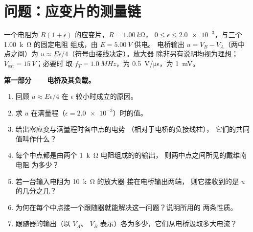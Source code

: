 \section{问题：应变片的测量链}

\begin{problem}
\label{pb:b1:operational-amplifier:1}
一个电阻为 $R(1 + \epsilon)$ 的应变片，$R = \qty{1.00}{k\ohm}$，
$0 \leq \epsilon \leq \num{2.0e-3}$，与三个 \qty{1.00}{k\ohm} 的固定电阻
组成，由 $E = \qty{5.00}{V}$ 供电。
电桥输出 $u = V_B - V_A$（两中点之间）为
$u \approx E\epsilon/4$（符号由接线决定）。放大器
除非另有说明均视为理想；$V_{\mathrm{sat}} = \qty{15}{V}$；必要时
取 $f_T = \qty{1.0}{MHz}$，为 \qty{0.5}{V/\micro s}，为
\qty{1}{mV}。

\medskip
\noindent\textbf{第一部分——电桥及其负载。}
\begin{enumerate}
  \item 回顾 $u \approx E\epsilon/4$ 在 $\epsilon$ 较小时成立的原因。
  \item 求 $u$ 在满量程（$\epsilon = \num{2.0e-3}$）时的值。
  \item 给出零应变与满量程时各中点的电势
        （相对于电桥的负接线柱），
        它们的共同值叫作什么？
  \item 每个中点都是由两个 \qty{1}{k\ohm} 电阻组成的的输出，
        则两中点之间所见的戴维南电阻
        为多少？
  \item 若一台输入电阻为 \qty{10}{k\ohm} 的放大器
        接在电桥输出两端，
        则它接收到的是 $u$ 的几分之几？
  \item 为何在每个中点接一个跟随器就能解决这一问题？说明所用的
        两条性质。
  \item 跟随器的输出（以 $V_A$、
        $V_B$ 表示）各为多少，它们从电桥汲取多大电流？
\end{enumerate}


\end{problem}
